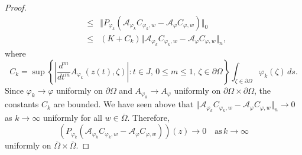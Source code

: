 \documentclass[10pt,a4paper]{amsart}
\begin{document}
\begin{proof}
\begin{eqnarray*}
&\leq& 
\Vert P_{\varphi_k}(\mathcal{A}_{\varphi_k} C_{\varphi_k,w}-\mathcal{A}_{\varphi} C_{\varphi,w}) \Vert_0\\
&\leq& 
(K+C_k) \Vert \mathcal{A}_{\varphi_k} C_{\varphi_k,w}-\mathcal{A}_{\varphi} C_{\varphi,w}\Vert_n,
\end{eqnarray*}
where
\[
C_k=\sup\left\lbrace\left\lvert \frac{d^m}{dt^m} A_{\varphi_k}(z(t),\zeta) \right\rvert:t\in J,\,0\leq m\leq 1,\,\zeta\in\partial\Omega\right\rbrace 
\int_{\zeta\in\partial\Omega}\varphi_k(\zeta)\,ds.
\]
Since $\varphi_k\rightarrow\varphi$ uniformly on $\partial\Omega$ and $A_{\varphi_k}\rightarrow A_{\varphi}$ uniformly on $\partial\Omega\times\partial\Omega$, the constants $C_k$ are bounded. We have seen above that $\Vert \mathcal{A}_{\varphi_k} C_{\varphi_k,w}-\mathcal{A}_{\varphi} C_{\varphi,w}\Vert_n\rightarrow 0$ as $k\rightarrow\infty$ uniformly for all $w\in\overline{\Omega}$. Therefore,
\[
(P_{\varphi_k}(\mathcal{A}_{\varphi_k} C_{\varphi_k,w}-\mathcal{A}_{\varphi} C_{\varphi,w}))(z)\rightarrow 0
\quad \text{as}\,k\rightarrow\infty
\]
uniformly on $\overline{\Omega}\times\overline{\Omega}$. 

\medskip


\end{proof}
\end{document}
